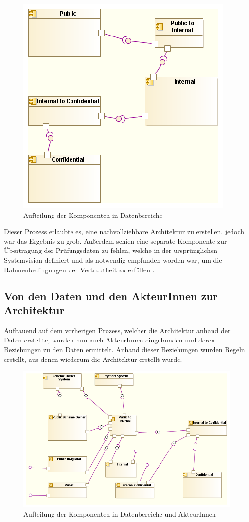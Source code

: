 \begin{figure}[!htbp]
    \centering
    \includegraphics[scale=0.7]{uml/vision3.png}
    \caption{Aufteilung der Komponenten in Datenbereiche}
\end{figure}

Dieser Prozess erlaubte es, eine nachvollziehbare Architektur zu erstellen, jedoch war das Ergebnis zu grob. Außerdem schien eine separate Komponente zur  Übertragung der Prüfungsdaten zu fehlen, welche in der ursprünglichen Systemvision definiert und als notwendig empfunden worden war, um die Rahmenbedingungen der Vertrautheit zu erfüllen \cite[7.3]{ISO_CERT}.

\subsection{Von den Daten und den AkteurInnen zur Architektur}
Aufbauend auf dem vorherigen Prozess, welcher die Architektur anhand der Daten erstellte, wurden nun auch AkteurInnen eingebunden und deren Beziehungen zu den Daten ermittelt. Anhand dieser Beziehungen wurden Regeln erstellt, aus denen wiederum die Architektur erstellt wurde.

\begin{figure}[!htbp]
    \centering
    \includegraphics[scale=0.55]{uml/vision4.png}
    \caption{Aufteilung der Komponenten in Datenbereiche und AkteurInnen}
\end{figure}

